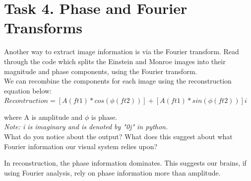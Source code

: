 \documentclass[12pt,english]{scrartcl}
\begin{document}
\section*{Task 4. Phase and Fourier Transforms}
\raggedright
Another way to extract image information is via the Fourier transform. Read through the code which splits the Einstein and Monroe images into their magnitude and phase components, using the Fourier transform.  \\
\bigskip
We can recombine the components for each image using the reconstruction equation below: \\
\bigskip
\centering
$Recontruction = [A(ft1)*cos(\phi(ft2))] + [A(ft1)*sin(\phi(ft2))] i$ \\
\raggedright
where A is amplitude and $\phi$ is phase.\\
\bigskip
{\it Note: i is imaginary and is denoted by "0j" in python.} \\
\bigskip
What do you notice about the output? What does this suggest about what Fourier information our visual system relies upon?

\color{blue}
In reconstruction, the phase information dominates. This suggests our brains, if using Fourier analysis, rely on phase information more than amplitude.


 
\end{document}
